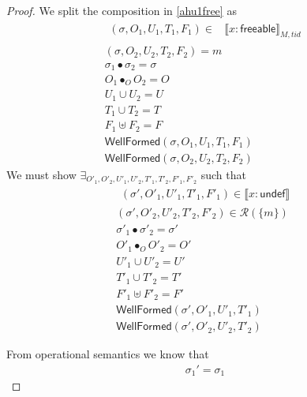 \begin{proof}
We split the composition in  \ref{ahu1free} as 
\begin{gather} \label{ahu11free}
  \begin{aligned}
    (\sigma, O_{1}, U_{1}, T_{1},F_1 ) \in & \llbracket  x:\textsf{freeable}  \rrbracket_{M,tid}  \end{aligned}\\
  \label{ahu12free}
(\sigma, O_{2}, U_{2}, T_{2},F_2) = m
  \\
  \label{ahufreesig}
  \sigma_1 \bullet \sigma_2 = \sigma
  \\
\label{ahu13free}
O_{1} \bullet_{O} O_{2} = O
\\
\label{ahu14free}U
_{1} \cup U_{2} = U
\\
\label{ahu15free}
T_{1} \cup T_{2} = T
\\
\label{ahufreeF}
F_1 \uplus F_2 = F
\\
\label{ahu16free}
\textsf{WellFormed}(\sigma,O_{1},U_{1},T_{1},F_1)
\\
\label{ahu17free}
\textsf{WellFormed}(\sigma,O_{2},U_{2},T_{2},F_2)
\end{gather}
We must show $\exists_{O'_{1}, O'_{2}, U'_{1}, U'_{2}, T'_{1}, T'_{2},F'_1, F'_2}$ such that
\begin{gather}\label{phu5free}
\begin{aligned}
(\sigma',O'_{1},U'_{1}, T'_{1},F'_1)  \in \llbracket  x:\textsf{undef}  \rrbracket 
\end{aligned}\\
\label{phu6free}
(\sigma',O'_{2},U'_{2}, T'_{2},F'_2) \in \mathcal{R}(\{m\})
\\
\label{phufreesig}
\sigma'_1 \bullet \sigma'_2 = \sigma'
\\
\label{phu7free}
O'_{1} \bullet_{O} O'_{2} = O'
\\
\label{phu8free}
U'_{1} \cup U'_{2} = U'
\\
\label{phu9free}
T'_{1} \cup T'_{2} = T'
\\
\label{phufreeF}
F'_1 \uplus F'_2 = F'
\\
\label{phu10free}
\textsf{WellFormed}(\sigma',O'_{1},U'_{1},T'_{1}) \\
\label{phu11free}
\textsf{WellFormed}(\sigma',O'_{2},U'_{2},T'_{2})
\end{gather}

From operational semantics we know that
\begin{gather}\label{ahusfree}
\sigma_1' =  \sigma_1
\end{gather}


\end{proof}

